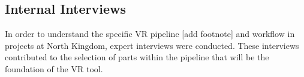 \subsection{Internal Interviews}
In order to understand the specific VR pipeline [add footnote] and workflow in projects at North Kingdom, expert interviews were conducted. These interviews contributed to the selection of parts within the pipeline that will be the foundation of the VR tool.
